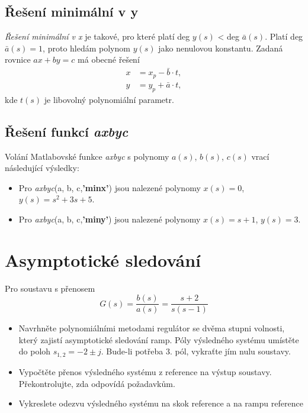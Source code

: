 \documentclass[twoside]{article}
\begin{document}
\subsection{Řešení minimální v y}
\textit{Řešení minimální v x} je takové, pro které platí deg $y(s)$ < deg $\bar{a}(s)$. Platí deg $\bar{a}(s) = 1$,
proto hledám polynom $y(s)$ jako nenulovou konstantu. Zadaná rovnice $ax + by = c$ má obecné řešení
\begin{equation}
	\begin{align}
		x &= x_p - \bar{b} \cdot t, \\
		y &= y_p + \bar{a} \cdot t,
	\end{align}
\end{equation}
kde $t(s)$ je libovolný polynomiální parametr.

\subsection{Řešení funkcí \textit{axbyc}}
Volání Matlabovské funkce \textit{axbyc} s polynomy $a(s)$, $b(s)$, $c(s)$ vrací následující výsledky:
\begin{itemize}
	\item Pro \textit{axbyc}(a, b, c,\textbf{'minx'}) jsou nalezené polynomy $x(s) = 0$, $y(s) = s^2 + 3s + 5$.
	\item Pro \textit{axbyc}(a, b, c,\textbf{'miny'}) jsou nalezené polynomy $x(s) = s+1$, $y(s) = 3$.
\end{itemize}

\section{Asymptotické sledování}
Pro soustavu s přenosem
\begin{equation}
	\label{eq:prenos}
	G(s) = \frac{b(s)}{a(s)} = \frac{s+2}{s(s-1)}
\end{equation}

\begin{itemize}
	\item  Navrhněte polynomiálními metodami regulátor se dvěma stupni volnosti, který zajistí asymptotické
	sledování ramp. Póly výsledného systému umístěte do poloh $s_{1,2} = -2 \pm j$. Bude-li potřeba 3. pól, vykraťte
	jím nulu soustavy.
 	\item Vypočtěte přenos výsledného systému z reference na výstup soustavy. Překontrolujte, zda odpovídá
	požadavkům.
	\item Vykreslete odezvu výsledného systému na skok reference a na rampu reference
\end{itemize}
\end{document}
